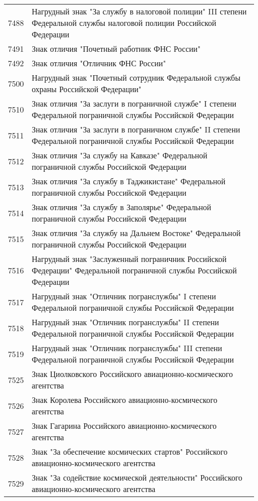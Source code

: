\documentclass[10pt, a4paper, titlepage]{article}
\begin{document}
\begin{center}
\begin{longtable}{rp{}}
        7488 & Нагрудный знак "За службу в налоговой полиции" III степени Федеральной службы налоговой полиции Российской Федерации \\
        7491 & Знак отличия "Почетный работник ФНС России" \\
        7492 & Знак отличия "Отличник ФНС России" \\
        7500 & Нагрудный знак "Почетный сотрудник Федеральной службы охраны Российской Федерации" \\
        7510 & Знак отличия "За заслуги в пограничной службе" I степени Федеральной пограничной службы Российской Федерации \\
        7511 & Знак отличия "За заслуги в пограничном службе" II степени Федеральной пограничной службы Российской Федерации \\
        7512 & Знак отличия "За службу на Кавказе" Федеральной пограничной службы Российской Федерации \\
        7513 & Знак отличия "За службу в Таджикистане" Федеральной пограничной службы Российской Федерации \\
        7514 & Знак отличия "За службу в Заполярье" Федеральной пограничной службы Российской Федерации \\
        7515 & Знак отличия "За службу на Дальнем Востоке" Федеральной пограничной службы Российской Федерации \\
        7516 & Нагрудный знак "Заслуженный пограничник Российской Федерации" Федеральной пограничной службы Российской Федерации \\
        7517 & Нагрудный знак "Отличник погранслужбы" I степени Федеральной пограничной службы Российской Федерации \\
        7518 & Нагрудный знак "Отличник погранслужбы" II степени Федеральной пограничной службы Российской Федерации \\
        7519 & Нагрудный знак "Отличник погранслужбы" III степени Федеральной пограничной службы Российской Федерации \\
        7525 & Знак Циолковского Российского авиационно-космического агентства \\
        7526 & Знак Королева Российского авиационно-космического агентства \\
        7527 & Знак Гагарина Российского авиационно-космического агентства \\
        7528 & Знак "За обеспечение космических стартов" Российского авиационно-космического агентства \\
        7529 & Знак "За содействие космической деятельности" Российского авиационно-космического агентства \\

\end{longtable}
\end{center}
\end{document}
